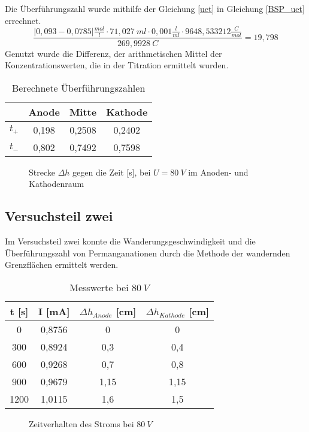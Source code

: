 Die Überführungszahl wurde mithilfe der Gleichung \ref{uet} in Gleichung \ref{BSP_uet} errechnet.
\begin{equation}
\frac{\left|0,093-0,0785\right|\frac{mol}{l}\cdot 71,027\ ml\cdot 0,001\frac{l}{ml}\cdot 9648,533212\frac{C}{mol}}{269,9928\ C} = 19,798
\label{BSP_uet}
\end{equation}
Genutzt wurde die Differenz, der arithmetischen Mittel der Konzentrationswerten, die in der Titration ermittelt wurden.
\begin{table}
\centering
\begin{tabular}{lccc}
	& Anode & Mitte & Kathode\\
\hline
$t_+$ & 0,198 & 0,2508 & 0,2402\\
$t_-$ & 0,802 & 0,7492 & 0,7598\\
\end{tabular}
\caption{Berechnete Überführungszahlen}
\label{T3}
\end{table}
\begin{figure}[b]
\centering

\caption{Strecke $\Delta h$ gegen die Zeit [s], bei $U=80\ V$ im Anoden- und Kathodenraum} 
\label{abb3}
\end{figure}
\newpage

\subsection{Versuchsteil zwei}
Im Versuchsteil zwei konnte die Wanderungsgeschwindigkeit und die Überführungszahl von Permanganationen durch die Methode der wandernden Grenzflächen ermittelt werden. 
\begin{table}
\centering
\begin{tabular}{cccc}
t [s] & I [mA] & $\Delta h_{Anode}$ [cm] & $\Delta h_{Kathode}$ [cm]\\
\hline
0 & 0,8756 & 0 & 0\\
300 & 0,8924 & 0,3 & 0,4\\
600 & 0,9268 & 0,7 & 0,8\\
900 & 0,9679 & 1,15 & 1,15\\
1200 & 1,0115 & 1,6 & 1,5\\
\end{tabular}
\caption{Messwerte bei $80\ V$}
\label{T3}
\end{table}

\begin{figure}
\centering

\caption{Zeitverhalten des Stroms bei $80\ V$}
\label{abb2}
\end{figure}

